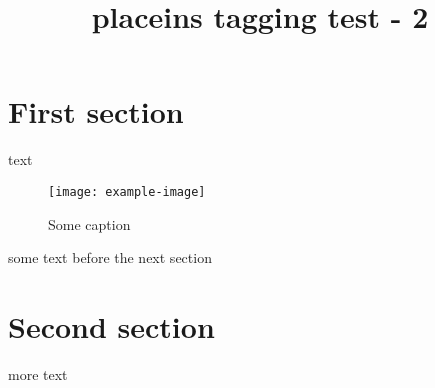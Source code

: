 \documentclass{article}
\title{placeins tagging test - 2}
\begin{document}
\section{First section}
text
\begin{figure}[!h]
\centering
\texttt{[image: example-image]}
\caption{Some caption}
\end{figure}
\FloatBarrier
some text before the next section
\section{Second section}
more text
\end{document}
